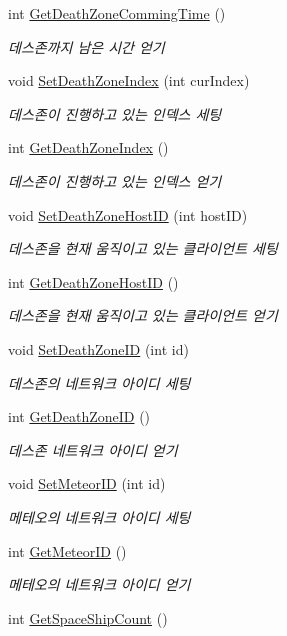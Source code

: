 \begin{DoxyCompactItemize}
int \hyperlink{class_server_abd194d047570b5959ae56948d4bbc9bd}{Get\+Death\+Zone\+Comming\+Time} ()
\begin{DoxyCompactList}\small\item\em 데스존까지 남은 시간 얻기 \end{DoxyCompactList}\item 
void \hyperlink{class_server_a9b58e281b966a1a804c89a30298285d1}{Set\+Death\+Zone\+Index} (int cur\+Index)
\begin{DoxyCompactList}\small\item\em 데스존이 진행하고 있는 인덱스 세팅 \end{DoxyCompactList}\item 
int \hyperlink{class_server_a636f3c3d5fe8406197f9ea30409fb725}{Get\+Death\+Zone\+Index} ()
\begin{DoxyCompactList}\small\item\em 데스존이 진행하고 있는 인덱스 얻기 \end{DoxyCompactList}\item 
void \hyperlink{class_server_a78cb51003b1a243780c2845263e75b29}{Set\+Death\+Zone\+Host\+ID} (int host\+ID)
\begin{DoxyCompactList}\small\item\em 데스존을 현재 움직이고 있는 클라이언트 세팅 \end{DoxyCompactList}\item 
int \hyperlink{class_server_a2e2dda4eb32e6f0a43ca8aba93d4d9a9}{Get\+Death\+Zone\+Host\+ID} ()
\begin{DoxyCompactList}\small\item\em 데스존을 현재 움직이고 있는 클라이언트 얻기 \end{DoxyCompactList}\item 
void \hyperlink{class_server_a97583a37e049f390e255a61afbac02a2}{Set\+Death\+Zone\+ID} (int id)
\begin{DoxyCompactList}\small\item\em 데스존의 네트워크 아이디 세팅 \end{DoxyCompactList}\item 
int \hyperlink{class_server_ad0f632640a71c4d229e17e7b9eb2257d}{Get\+Death\+Zone\+ID} ()
\begin{DoxyCompactList}\small\item\em 데스존 네트워크 아이디 얻기 \end{DoxyCompactList}\item 
void \hyperlink{class_server_a582ad4eb2272b1ab92daad71dc700e8d}{Set\+Meteor\+ID} (int id)
\begin{DoxyCompactList}\small\item\em 메테오의 네트워크 아이디 세팅 \end{DoxyCompactList}\item 
int \hyperlink{class_server_a2c9b6a25a8add5d74b5f3bcfeff956ec}{Get\+Meteor\+ID} ()
\begin{DoxyCompactList}\small\item\em 메테오의 네트워크 아이디 얻기 \end{DoxyCompactList}\item 
int \hyperlink{class_server_a43c5961b9519b2358127956c817a2120}{Get\+Space\+Ship\+Count} ()
\end{DoxyCompactItemize}
